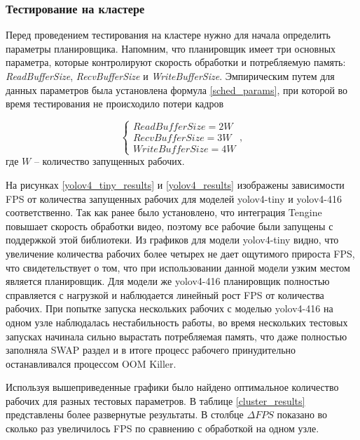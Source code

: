 \subsubsection{Тестирование на кластере}
Перед проведением тестирования на кластере нужно для начала определить параметры планировщика. Напомним, что планировщик 
имеет три основных параметра, которые контролируют скорость обработки и потребляемую память: \emph{ReadBufferSize}, 
\emph{RecvBufferSize} и \emph{WriteBufferSize}. Эмпирическим путем для данных параметров была установлена формула 
\ref{sched_params}, при которой во время тестирования не происходило потери кадров

\begin{equation}\label{sched_params}
    \begin{cases}
        ReadBufferSize = 2W \\
        RecvBufferSize=3W \\
        WriteBufferSize=4W
    \end{cases},
\end{equation}
где $W$ -- количество запущенных рабочих.

На рисунках \ref{yolov4_tiny_results} и \ref{yolov4_results} изображены зависимости FPS от количества запущенных рабочих
для моделей yolov4-tiny и yolov4-416 соответственно. Так как ранее было установлено, что интеграция Tengine повышает
скорость обработки видео, поэтому все рабочие были запущены с поддержкой этой библиотеки. Из графиков для модели yolov4-tiny
видно, что увеличение количества рабочих более четырех не дает ощутимого прироста FPS, что свидетельствует о том, что при 
использовании данной модели узким местом является планировщик. Для модели же yolov4-416 планировщик полностью справляется 
с нагрузкой и наблюдается линейный рост FPS от количества рабочих. При попытке запуска нескольких рабочих с моделью yolov4-416
на одном узле наблюдалась нестабильность работы, во время нескольких тестовых запусках начинала сильно вырастать потребляемая 
память, что даже полностью заполняла SWAP раздел и в итоге процесс рабочего принудительно останавливался процессом OOM Killer.



Используя вышеприведенные графики было найдено оптимальное количество рабочих для разных тестовых параметров. В таблице 
\ref{cluster_results} представлены более развернутые результаты. В столбце $\Delta FPS$ показано во сколько раз увеличилось 
FPS по сравнению с обработкой на одном узле.

